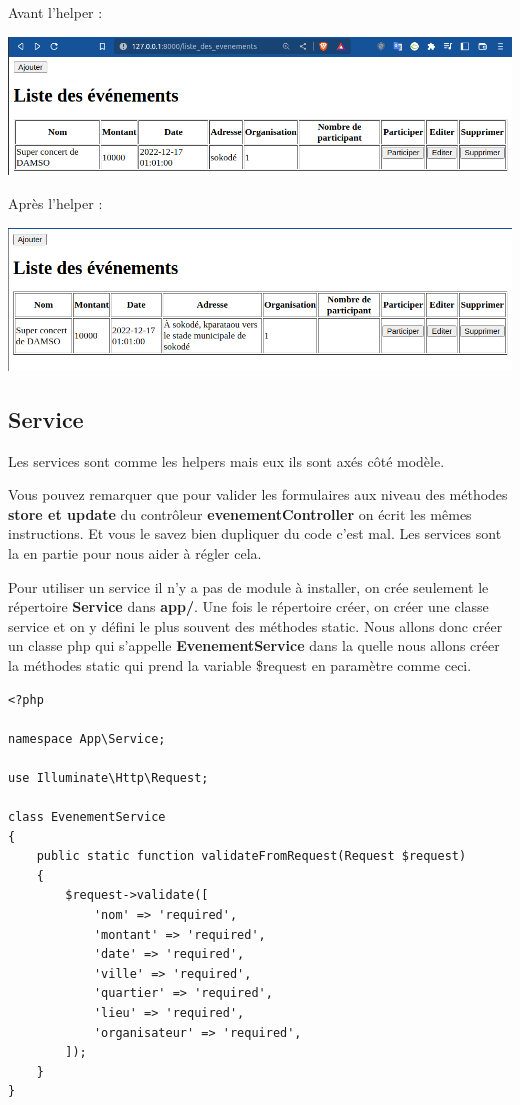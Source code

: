 \documentclass[12pt,a4paper]{article}
\begin{document}
Avant l'helper :\\
\begin{center}
\includegraphics[scale=0.5]{img/evenement_before_helper.png}
\end{center}
Après l'helper :
\begin{center}
\includegraphics[scale=0.5]{img/evenement_after_helper.png}
\end{center}

\subsection{Service}

Les services sont comme les helpers mais eux ils sont axés côté modèle.\par
Vous pouvez remarquer que pour valider les formulaires aux niveau des méthodes \textbf{store et update}
du contrôleur \textbf{evenementController} on écrit les mêmes instructions. Et vous le savez bien dupliquer du code c'est mal. Les services sont la en partie pour nous aider à régler cela.\par
Pour utiliser un service il n'y a pas de module à installer, on crée seulement le répertoire \textbf{Service} dans \textbf{app/}. Une fois le répertoire créer, on créer une classe service et on y défini le plus souvent des méthodes static. Nous allons donc créer un classe php qui s'appelle
\textbf{EvenementService} dans la quelle nous allons créer la méthodes static \textbf{} qui prend la variable \$request en paramètre comme ceci.

\begin{verbatim}
<?php

namespace App\Service;

use Illuminate\Http\Request;

class EvenementService
{
    public static function validateFromRequest(Request $request)
    {
        $request->validate([
            'nom' => 'required',
            'montant' => 'required',
            'date' => 'required',
            'ville' => 'required',
            'quartier' => 'required',
            'lieu' => 'required',
            'organisateur' => 'required',
        ]);
    }
}
\end{verbatim}
\end{document}

